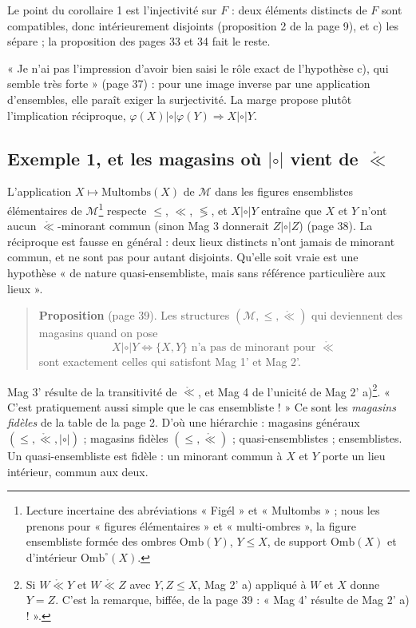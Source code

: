 \documentclass[11pt,a4paper]{article}
\begin{document}
Le point du corollaire 1 est l'injectivité sur $F$ : deux éléments distincts de
$F$ sont compatibles, donc intérieurement disjoints (proposition 2 de la page
9), et c) les sépare ; la proposition des pages 33 et 34 fait le reste.

« Je n'ai pas l'impression d'avoir bien saisi le rôle exact de l'hypothèse c),
qui semble très forte » (page 37) : pour une image inverse par une application
d'ensembles, elle paraît exiger la surjectivité. La marge propose plutôt
l'implication réciproque, $\varphi(X) \mathrel{|\circ|} \varphi(Y) \Rightarrow X
\mathrel{|\circ|} Y$.

\subsection*{Exemple 1, et les magasins où $\mathrel{|\circ|}$ vient de
$\mathring{\ll}$}

L'application $X \mapsto \mathrm{Multombs}(X)$ de $\mathcal{M}$ dans les
figures ensemblistes élémentaires de $\mathcal{M}$\footnote{Lecture incertaine
des abréviations « Figél » et « Multombs » ; nous les prenons pour
« figures élémentaires » et « multi-ombres », la figure ensembliste formée des
ombres $\mathrm{Omb}(Y)$, $Y \leq X$, de support $\mathrm{Omb}(X)$ et
d'intérieur $\mathrm{Omb}^{\circ}(X)$.} respecte $\leq$, $\ll$, $\lessgtr$, et
$X \mathrel{|\circ|} Y$ entraîne que $X$ et $Y$ n'ont aucun
$\mathring{\ll}$-minorant commun (sinon Mag 3 donnerait $Z \mathrel{|\circ|} Z$)
(page 38). La réciproque est fausse en général : deux lieux distincts n'ont
jamais de minorant commun, et ne sont pas pour autant disjoints. Qu'elle soit
vraie est une hypothèse « de nature quasi-ensembliste, mais sans référence
particulière aux lieux ».

\begin{quote}
\textbf{Proposition} (page 39). Les structures $(\mathcal{M}, \leq,
\mathring{\ll})$ qui deviennent des magasins quand on pose
\[
X \mathrel{|\circ|} Y \iff \{X, Y\} \text{ n'a pas de minorant pour }
\mathring{\ll}
\]
sont exactement celles qui satisfont Mag 1' et Mag 2'.
\end{quote}

Mag 3' résulte de la transitivité de $\mathring{\ll}$, et Mag 4 de l'unicité
de Mag 2' a)\footnote{Si $W \mathrel{\mathring{\ll}} Y$ et $W
\mathrel{\mathring{\ll}} Z$ avec $Y, Z \leq X$, Mag 2' a) appliqué à $W$ et $X$
donne $Y = Z$. C'est la remarque, biffée, de la page 39 : « Mag 4' résulte de
Mag 2' a) ! ».}. « C'est pratiquement aussi simple que le cas ensembliste ! »
Ce sont les \emph{magasins fidèles} de la table de la page 2. D'où une
hiérarchie : magasins généraux $(\leq, \mathring{\ll}, \mathrel{|\circ|})$ ;
magasins fidèles $(\leq, \mathring{\ll})$ ; quasi-ensemblistes ; ensemblistes.
Un quasi-ensembliste est fidèle : un minorant commun à $X$ et $Y$ porte un lieu
intérieur, commun aux deux.
\end{document}
